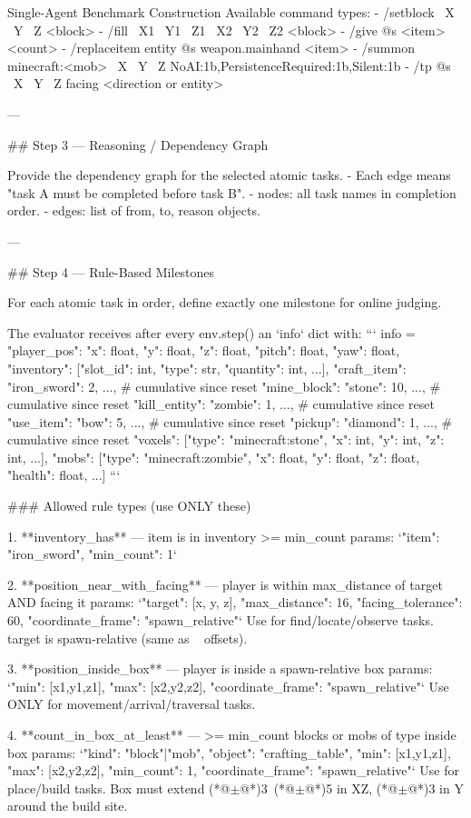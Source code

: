 \documentclass[11pt]{article}
\begin{document}
\begin{center}
\begin{widepromptbox}{Single-Agent Benchmark Construction}
Available command types:
- /setblock ~X ~Y ~Z <block>
- /fill ~X1 ~Y1 ~Z1 ~X2 ~Y2 ~Z2 <block>
- /give @s <item> <count>
- /replaceitem entity @s weapon.mainhand <item>
- /summon minecraft:<mob> ~X ~Y ~Z {NoAI:1b,PersistenceRequired:1b,Silent:1b}
- /tp @s ~X ~Y ~Z facing <direction or entity>

---

## Step 3 — Reasoning / Dependency Graph

Provide the dependency graph for the selected atomic tasks.
- Each edge means "task A must be completed before task B".
- nodes: all task names in completion order.
- edges: list of {from, to, reason} objects.

---

## Step 4 — Rule-Based Milestones

For each atomic task in order, define exactly one milestone for online judging.

The evaluator receives after every env.step() an `info` dict with:
```
info = {
  "player_pos":    {"x": float, "y": float, "z": float, "pitch": float, "yaw": float},
  "inventory":     [{"slot_id": int, "type": str, "quantity": int}, ...],
  "craft_item":    {"iron_sword": 2, ...},   # cumulative since reset
  "mine_block":    {"stone": 10, ...},       # cumulative since reset
  "kill_entity":   {"zombie": 1, ...},       # cumulative since reset
  "use_item":      {"bow": 5, ...},          # cumulative since reset
  "pickup":        {"diamond": 1, ...},      # cumulative since reset
  "voxels":        [{"type": "minecraft:stone", "x": int, "y": int, "z": int}, ...],
  "mobs":          [{"type": "minecraft:zombie", "x": float, "y": float, "z": float, "health": float}, ...]
}
```

### Allowed rule types (use ONLY these)

1. **inventory_has** — item is in inventory >= min_count
   params: `{"item": "iron_sword", "min_count": 1}`

2. **position_near_with_facing** — player is within max_distance of target AND facing it
   params: `{"target": [x, y, z], "max_distance": 16, "facing_tolerance": 60, "coordinate_frame": "spawn_relative"}`
   Use for find/locate/observe tasks. target is spawn-relative (same as ~ offsets).

3. **position_inside_box** — player is inside a spawn-relative box
   params: `{"min": [x1,y1,z1], "max": [x2,y2,z2], "coordinate_frame": "spawn_relative"}`
   Use ONLY for movement/arrival/traversal tasks.

4. **count_in_box_at_least** — >= min_count blocks or mobs of type inside box
   params: `{"kind": "block"|"mob", "object": "crafting_table", "min": [x1,y1,z1], "max": [x2,y2,z2], "min_count": 1, "coordinate_frame": "spawn_relative"}`
   Use for place/build tasks. Box must extend (*@$\pm$@*)3~(*@$\pm$@*)5 in XZ, (*@$\pm$@*)3 in Y around the build site.


\end{widepromptbox}
\end{center}
\end{document}
